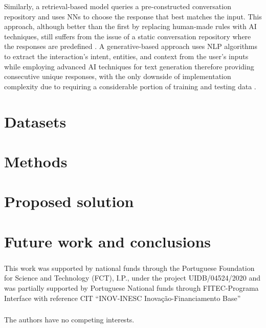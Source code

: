 \documentclass[runningheads]{llncs}
\begin{document}
Similarly, a retrieval-based model queries a pre-constructed conversation repository and uses NNs to choose the response that best matches the input. This approach, although better than the first by replacing human-made rules with AI techniques, still suffers from the issue of a static conversation repository where the responses are predefined \cite{ramesh_survey_2017}. A generative-based approach uses NLP algorithms to extract the interaction's intent, entities, and context from the user's inputs while employing advanced AI techniques for text generation therefore providing consecutive unique responses, with the only downside of implementation complexity due to requiring a considerable portion of training and testing data \cite{ramesh_survey_2017}.

\section{Datasets}
\label{sec:datasets}


\section{Methods}
\label{sec:methods}


\section{Proposed solution}
\label{sec:solution}


\section{Future work and conclusions}
\label{sec:conclusions}

\begin{credits}
\subsubsection{\ackname} This work was supported by national funds through the Portuguese Foundation for Science and Technology (FCT), I.P., under the project UIDB/04524/2020 and was partially supported by Portuguese National funds through FITEC-Programa Interface with reference CIT “INOV-INESC Inovação-Financiamento Base”

\subsubsection{\discintname}
The authors have no competing interests.
\end{credits}
%
%
%


%
\end{document}

